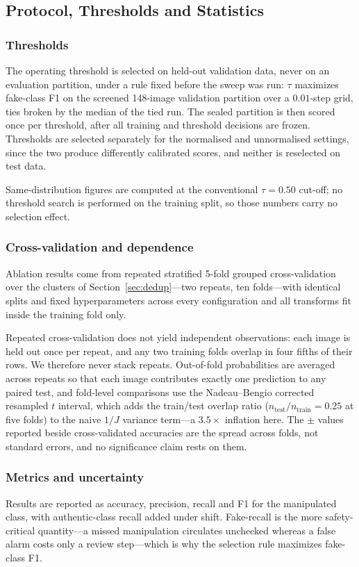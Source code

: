 \documentclass[pdflatex,sn-mathphys-num]{sn-jnl}
\begin{document}
\subsection{Protocol, Thresholds and Statistics}
\label{sec:training}

\subsubsection{Thresholds}
The operating threshold is selected on held-out validation data, never on an
evaluation partition, under a rule fixed before the sweep was run: $\tau$
maximizes fake-class F1 on the screened 148-image validation partition over a
$0.01$-step grid, ties broken by the median of the tied run. The sealed
partition is then scored once per threshold, after all training and threshold
decisions are frozen. Thresholds are selected separately for the normalised and
unnormalised settings, since the two produce differently calibrated scores, and
neither is reselected on test data.

Same-distribution figures are computed at the conventional $\tau = 0.50$
cut-off; no threshold search is performed on the training split, so those
numbers carry no selection effect.

\subsubsection{Cross-validation and dependence}
Ablation results come from repeated stratified 5-fold grouped cross-validation
over the clusters of Section~\ref{sec:dedup}---two repeats, ten folds---with
identical splits and fixed hyperparameters across every configuration and all
transforms fit inside the training fold only.

Repeated cross-validation does not yield independent observations: each image
is held out once per repeat, and any two training folds overlap in four fifths
of their rows. We therefore never stack repeats. Out-of-fold probabilities are
averaged across repeats so that each image contributes exactly one prediction
to any paired test, and fold-level comparisons use the Nadeau--Bengio corrected
resampled $t$ interval, which adds the train/test overlap ratio
($n_{\text{test}}/n_{\text{train}} = 0.25$ at five folds) to the naive $1/J$
variance term---a $3.5\times$ inflation here. The $\pm$ values reported beside
cross-validated accuracies are the spread across folds, not standard errors,
and no significance claim rests on them.

\subsubsection{Metrics and uncertainty}
Results are reported as accuracy, precision, recall and F1 for the manipulated
class, with authentic-class recall added under shift. Fake-recall is the more
safety-critical quantity---a missed manipulation circulates unchecked whereas a
false alarm costs only a review step---which is why the selection rule
maximizes fake-class F1.
\end{document}
